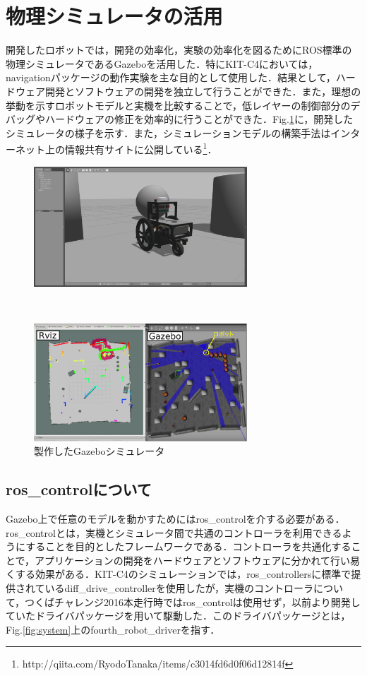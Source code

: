 \documentclass[10pt,a4paper]{jarticle}
\begin{document}
\section{物理シミュレータの活用}
開発したロボットでは，開発の効率化，実験の効率化を図るためにROS標準の物理シミュレータであるGazebo\cite{gazebo}を活用した．特にKIT-C4においては，navigationパッケージの動作実験を主な目的として使用した．結果として，ハードウェア開発とソフトウェアの開発を独立して行うことができた．また，理想の挙動を示すロボットモデルと実機を比較することで，低レイヤーの制御部分のデバッグやハードウェアの修正を効率的に行うことができた．Fig.\ref{fig:gazebo}に，開発したシミュレータの様子を示す．また，シミュレーションモデルの構築手法はインターネット上の情報共有サイトに公開している\footnote{http://qiita.com/RyodoTanaka/items/c3014fd6d0f06d12814f}．
\begin{figure}[tbh]
  \begin{minipage}[b]{1.0\linewidth}
  \centering
  \includegraphics[keepaspectratio, width=8cm]
  {fig/gazebo.eps}
  \end{minipage}\\
 \begin{minipage}[b]{1.0\linewidth}
  \centering
  \includegraphics[keepaspectratio, width=8cm]
  {fig/navigation.eps}
 \end{minipage}
 \caption{製作したGazeboシミュレータ}\label{fig:gazebo}
\end{figure}
\subsection{ros\_controlについて}
Gazebo上で任意のモデルを動かすためにはros\_controlを介する必要がある．ros\_controlとは，実機とシミュレータ間で共通のコントローラを利用できるようにすることを目的としたフレームワークである．コントローラを共通化することで，アプリケーションの開発をハードウェアとソフトウェアに分かれて行い易くする効果がある．KIT-C4のシミュレーションでは，ros\_controllersに標準で提供されているdiff\_drive\_controllerを使用したが，実機のコントローラについて，つくばチャレンジ2016本走行時ではros\_controlは使用せず，以前より開発していたドライバパッケージを用いて駆動した．このドライバパッケージとは，Fig.\ref{fig:system}上のfourth\_robot\_driverを指す．
\end{document}
